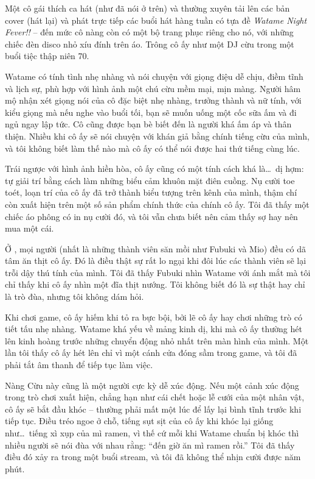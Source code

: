 \documentclass[../main.tex]{subfiles}
\begin{document}
Một cô gái thích ca hát (như đã nói ở trên) và thường xuyên tải lên các bản cover (hát lại) và phát trực tiếp các buổi hát hàng tuần có tựa đề \textit{Watame Night Fever!!} – đến mức cô nàng còn có một bộ trang phục riêng cho nó, với những chiếc đèn disco nhỏ xíu đính trên áo. Trông cô ấy như một DJ cừu trong một buổi tiệc thập niên 70.

Watame có tính tình nhẹ nhàng và nói chuyện với giọng điệu dễ chịu, điềm tĩnh và lịch sự, phù hợp với hình ảnh một chú cừu mềm mại, mịn màng. Người hâm mộ nhận xét giọng nói của cô đặc biệt nhẹ nhàng, trưởng thành và nữ tính, với kiểu giọng mà nếu nghe vào buổi tối, bạn sẽ muốn uống một cốc sữa ấm và đi ngủ ngay lập tức. Cô cũng được bạn bè biết đến là người khá ấm áp và thân thiện. Nhiều khi cô ấy sẽ nói chuyện với khán giả bằng chính tiếng cừu của mình, và tôi không biết làm thế nào mà cô ấy có thể nói được hai thứ tiếng cùng lúc.


Trái ngược với hình ảnh hiền hòa, cô ấy cũng có một tính cách khá là\dots\ dị hợm: tự giải trí bằng cách làm những biểu cảm khuôn mặt điên cuồng. Nụ cười toe toét, loạn trí của cô ấy đã trở thành biểu tượng trên kênh của mình, thậm chí còn xuất hiện trên một số sản phẩm chính thức của chính cô ấy. Tôi đã thấy một chiếc áo phông có in nụ cười đó, và tôi vẫn chưa biết nên cảm thấy sợ hay nên mua một cái.

Ở \hll, mọi người (nhất là những thành viên săn mồi như Fubuki và Mio) đều có dã tâm ăn thịt cô ấy. Đó là điều thật sự rất lo ngại khi đôi lúc các thành viên sẽ lại trỗi dậy thú tính của mình. Tôi đã thấy Fubuki nhìn Watame với ánh mắt mà tôi chỉ thấy khi cô ấy nhìn một đĩa thịt nướng. Tôi không biết đó là sự thật hay chỉ là trò đùa, nhưng tôi không dám hỏi.

Khi chơi game, cô ấy hiếm khi tỏ ra bực bội, bởi lẽ cô ấy hay chơi những trò có tiết tấu nhẹ nhàng. Watame khá yếu về mảng kinh dị, khi mà cô ấy thường hét lên kinh hoàng trước những chuyển động nhỏ nhất trên màn hình của mình. Một lần tôi thấy cô ấy hét lên chỉ vì một cánh cửa đóng sầm trong game, và tôi đã phải tắt âm thanh để tiếp tục làm việc.

Nàng Cừu này cũng là một người cực kỳ dễ xúc động. Nếu một cảnh xúc động trong trò chơi xuất hiện, chẳng hạn như cái chết hoặc lễ cưới của một nhân vật, cô ấy sẽ bắt đầu khóc – thường phải mất một lúc để lấy lại bình tĩnh trước khi tiếp tục. Điều tréo ngoe ở chỗ, tiếng sụt sịt của cô ấy khi khóc lại giống như\dots\ tiếng xì xụp của mì ramen, vì thế cứ mỗi khi Watame chuẩn bị khóc thì nhiều người sẽ nói đùa với nhau rằng: ``đến giờ ăn mì ramen rồi.'' Tôi đã thấy điều đó xảy ra trong một buổi stream, và tôi đã không thể nhịn cười được năm phút.
\end{document}
